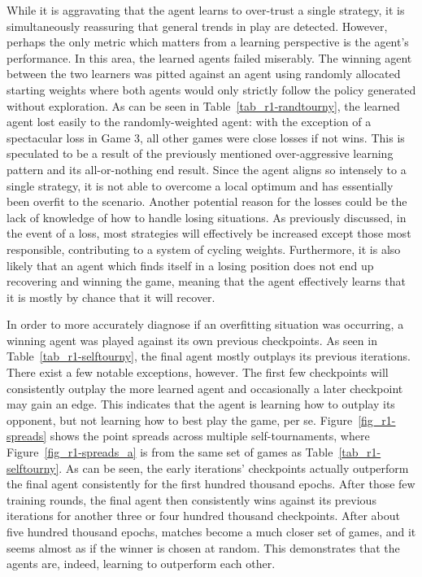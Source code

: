 While it is
aggravating that the agent learns to over-trust a single strategy,
it is simultaneously reassuring that general trends in play are detected.
%
However, perhaps the only metric which matters from a learning perspective is
the agent's performance.
%
In this area, the learned agents failed miserably.
%
The winning agent between the two learners was pitted against
an agent using randomly allocated starting weights
where both agents would only strictly follow the policy generated
without exploration.
%
As can be seen in Table~\ref{tab_r1-randtourny},
the learned agent lost easily to the randomly-weighted agent:
with the exception of a spectacular loss in Game 3,
all other games were close losses if not wins.
%
This is speculated to be a result of the previously mentioned over-aggressive
learning pattern and its all-or-nothing end result.
%
Since the agent aligns so intensely to a single strategy,
it is not able to overcome a local optimum
and has essentially been overfit to the scenario.
%
Another potential reason for the losses could be the lack of knowledge of how to
handle losing situations.
%
As previously discussed,
in the event of a loss,
most strategies will effectively be increased except those most responsible,
contributing to a system of cycling weights.
%
Furthermore, it is also likely that an agent which finds itself in a losing
position does not end up recovering and winning the game,
meaning that
the agent effectively learns that it is mostly by chance that it will recover.




In order to more accurately diagnose if an overfitting situation was occurring,
a winning agent was played against its own previous checkpoints.
%
As seen in Table~\ref{tab_r1-selftourny},
the final agent mostly outplays its previous iterations.
%
There exist a few notable exceptions, however.
%
The first few checkpoints will consistently outplay the more learned agent
and occasionally a later checkpoint may gain an edge.
%
This indicates that the agent is learning how to outplay its opponent,
but not learning how to best play the game, per se.
%
Figure~\ref{fig_r1-spreads} shows the point spreads across multiple
self-tournaments,
where Figure~\ref{fig_r1-spreads_a} is from the same set of games as
Table~\ref{tab_r1-selftourny}.
%
As can be seen,
the early iterations' checkpoints actually outperform the
final agent consistently for the first hundred thousand epochs.
%
After those few training rounds,
the final agent then consistently wins against its previous iterations for
another three or four hundred thousand checkpoints.
%
After about five hundred thousand epochs,
matches become a much closer set of games,
and it seems almost as if the winner is chosen at random.
%
This demonstrates that the agents are, indeed, learning to outperform each
other.

